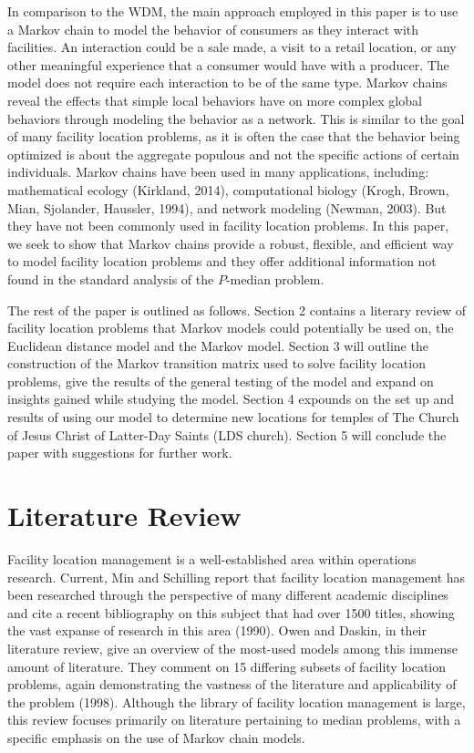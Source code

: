\documentclass[twoside,twocolumn]{article}
\begin{document}
In comparison to the WDM, the main approach employed in this paper is to use a Markov chain to model the behavior of consumers as they interact with facilities. 
An interaction could be a sale made, a visit to a retail location, or any other meaningful experience that a consumer would have with a producer.
The model does not require each interaction to be of the same type.
Markov chains reveal the effects that simple local behaviors have on more complex global behaviors through modeling the behavior as a network. %
This is similar to the goal of many facility location problems, as it is often the case that the behavior being optimized is about the aggregate populous and not the specific actions of certain individuals.
Markov chains have been used in many applications, including: mathematical ecology (Kirkland, 2014), computational biology (Krogh, Brown, Mian, Sjolander, Haussler, 1994), and network modeling (Newman, 2003). %
But they have not been commonly used in facility location problems. %
In this paper, we seek to show that Markov chains provide a robust, flexible, and efficient way to model facility location problems and they offer additional information not found in the standard analysis of the $P$-median problem.

The rest of the paper is outlined as follows.
Section 2 contains a literary review of facility location problems that Markov models could potentially be used on, the Euclidean distance model and the Markov model. %
Section 3 will outline the construction of the Markov transition matrix used to solve facility location problems, give the results of the general testing of the model and expand on insights gained while studying the model.
Section 4 expounds on the set up and results of using our model to determine new locations for temples of The Church of Jesus Christ of Latter-Day Saints (LDS church).
Section 5 will conclude the paper with suggestions for further work.

\section{Literature Review}

Facility location management is a well-established area within operations research. %
Current, Min and Schilling report that facility location management has been researched through the perspective of many different academic disciplines and cite a recent bibliography on this subject that had over 1500 titles, showing the vast expanse of research in this area (1990). %
Owen and Daskin, in their literature review, give an overview of the most-used models among this immense amount of literature.
They comment on 15 differing subsets of facility location problems, again demonstrating the vastness of the literature and applicability of the problem (1998).
Although the library of facility location management is large, this review focuses primarily on literature pertaining to median problems, with a specific emphasis on the use of Markov chain models. %
\end{document}

